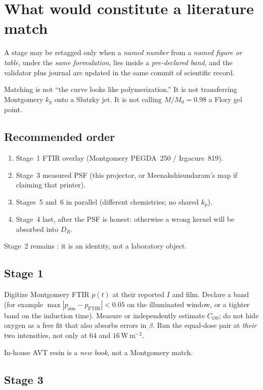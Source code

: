 \chapter{What would constitute a literature match}
\label{ch:matching}

A stage may be retagged \tagmatch{} only when a \emph{named number} from a \emph{named figure or table}, under the \emph{same formulation}, lies inside a \emph{pre-declared band}, and the validator plus journal are updated in the same commit of scientific record.

Matching is not ``the curve looks like polymerization.''
It is not transferring Montgomery $k_p$ onto a Slutzky jet.
It is not calling $M/M_0=0.98$ a Flory gel point.

\section{Recommended order}

\begin{enumerate}
  \item Stage~1 FTIR overlay (Montgomery PEGDA~$250$ / Irgacure~819).
  \item Stage~3 measured PSF (this projector, or Meenakshisundaram's map if claiming that printer).
  \item Stages~5 and~6 in parallel (different chemistries; no shared $k_p$).
  \item Stage~4 last, after the PSF is honest: otherwise a wrong kernel will be absorbed into $D_R$.
\end{enumerate}

Stage~2 remains \tagvalid{}: it is an identity, not a laboratory object.

\section{Stage 1}

Digitize Montgomery FTIR $p(t)$ at their reported $I$ and film.
Declare a band (for example $\max|p_{\mathrm{sim}}-p_{\mathrm{FTIR}}|<0.05$ on the illuminated window, or a tighter band on the induction time).
Measure or independently estimate $C_{O0}$; do not hide oxygen as a free fit that also absorbs errors in $\beta$.
Run the equal-dose pair at \emph{their} two intensities, not only at $64$ and $16\,\mathrm{W\,m^{-2}}$.

In-house AVT resin is a \emph{new book}, not a Montgomery match.

\section{Stage 3}

